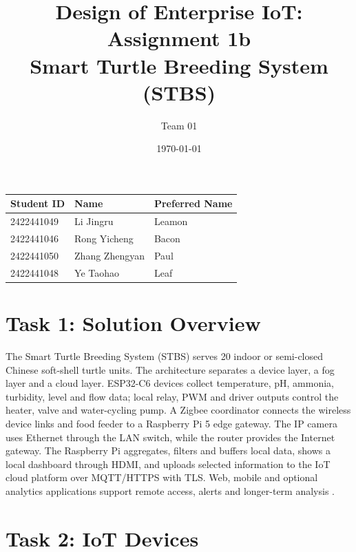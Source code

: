 \documentclass[lang=en,11pt,a4paper,citestyle=apa,bibstyle=apa]{elegantpaper}
\title{Design of Enterprise IoT: Assignment 1b\\[0.4em]
  \large Smart Turtle Breeding System (STBS)}
\author{\vspace{1em}\Large Team 01\vspace{1em}}
\institute{Jinling Institute of Technology}
\date{\today}
\begin{document}
\maketitle

\vspace{9cm}
\begin{center}
  \renewcommand{\arraystretch}{1}
  \begin{tabularx}{0.90\textwidth}{@{}llX@{}}
    \toprule
    \textbf{Student ID} &
    \textbf{Name} &
    \textbf{Preferred Name} \\
    \midrule
    2422441049 & Li Jingru      & Leamon \\
    2422441046 & Rong Yicheng   & Bacon  \\
    2422441050 & Zhang Zhengyan & Paul   \\
    2422441048 & Ye Taohao      & Leaf   \\
    \bottomrule
  \end{tabularx}
\end{center}

\clearpage

\tableofcontents
\clearpage

\section{Task 1: Solution Overview}

The Smart Turtle Breeding System (STBS) serves 20 indoor or semi-closed Chinese soft-shell turtle units. The architecture separates a device layer, a fog layer and a cloud layer. ESP32-C6 devices collect temperature, pH, ammonia, turbidity, level and flow data; local relay, PWM and driver outputs control the heater, valve and water-cycling pump. A Zigbee coordinator connects the wireless device links and food feeder to a Raspberry Pi 5 edge gateway. The IP camera uses Ethernet through the LAN switch, while the router provides the Internet gateway. The Raspberry Pi aggregates, filters and buffers local data, shows a local dashboard through HDMI, and uploads selected information to the IoT cloud platform over MQTT/HTTPS with TLS. Web, mobile and optional analytics applications support remote access, alerts and longer-term analysis \parencite{Prapti2022,Rastegari2023,Munyaev2026}.


\section{Task 2: IoT Devices}
\end{document}
